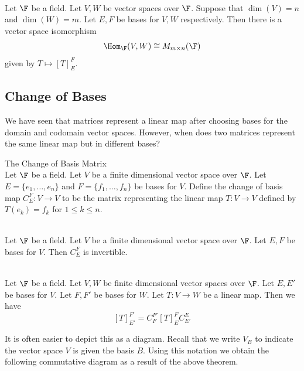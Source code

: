 \documentclass[a4paper]{article}
\begin{document}
\begin{prp}{}{}\\
Let $\F$ be a field. Let $V,W$ be vector spaces over $\F$. Suppose that $\dim(V)=n$ and $\dim(W)=m$. Let $E,F$ be bases for $V,W$ respectively. Then there is a vector space isomorphism $$\Hom_\F(V,W)\cong M_{m\times n}(\F)$$ given by $T\mapsto [T]_E^F$. 
\end{prp}

\subsection{Change of Bases}
We have seen that matrices represent a linear map after choosing bases for the domain and codomain vector spaces. However, when does two matrices represent the same linear map but in different bases?

\begin{defn}{The Change of Basis Matrix}{}\\
Let $\F$ be a field. Let $V$ be a finite dimensional vector space over $\F$. Let $E=\{e_1,\dots,e_n\}$ and $F=\{f_1,\dots,f_n\}$ be bases for $V$. Define the change of basis map $C_E^F:V\to V$ to be the matrix representing the linear map $T:V\to V$ defined by $T(e_k)=f_k$ for $1\leq k\leq n$. 
\end{defn}

\begin{lmm}{}{}\\
Let $\F$ be a field. Let $V$ be a finite dimensional vector space over $\F$. Let $E,F$ be bases for $V$. Then $C_E^F$ is invertible. 
\end{lmm}

\begin{prp}{}{}\\
Let $\F$ be a field. Let $V,W$ be finite dimensional vector spaces over $\F$. Let $E,E'$ be bases for $V$. Let $F,F'$ be bases for $W$. Let $T:V\to W$ be a linear map. Then we have $$[T]_{E'}^{F'}=C_F^{F'}[T]_E^FC_{E'}^E$$
\end{prp}

It is often easier to depict this as a diagram. Recall that we write $V_B$ to indicate the vector space $V$ is given the basis $B$. Using this notation we obtain the following commutative diagram as a result of the above theorem. \\~\\
\\
\end{document}
